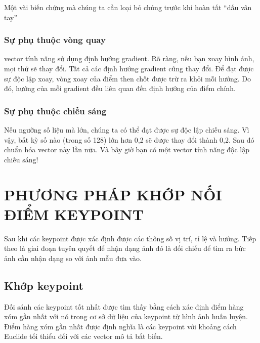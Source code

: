 \documentclass[conference]{IEEEtran}
\begin{document}
Một vài biến chứng mà chúng ta cần loại bỏ chúng trước khi hoàn tất “dấu vân tay”
\subsubsection{Sự phụ thuộc vòng quay}vector tính năng sử dụng định hướng gradient. Rõ ràng, nếu bạn xoay hình ảnh, mọi thứ sẽ thay đổi. Tất cả các định hướng gradient cũng thay đổi. Để đạt được sự độc lập xoay, vòng xoay của điểm then chốt được trừ ra khỏi mỗi hướng. Do đó, hướng của mỗi gradient đều liên quan đến định hướng của điểm chính.
\subsubsection{Sự phụ thuộc chiếu sáng}Nếu ngưỡng số liệu mà lớn, chúng ta có thể đạt được sự độc lập chiếu sáng. Vì vậy, bất kỳ số nào (trong số 128) lớn hơn 0,2 sẽ được thay đổi thành 0,2. Sau đó chuẩn hóa vector này lần nữa. Và bây giờ bạn có một vector tính năng độc lập chiếu sáng!
\medskip
\section{PHƯƠNG PHÁP KHỚP NỐI ĐIỂM KEYPOINT}
\label{Sec:PhuongPhapMatching}
Sau khi các keypoint được xác định được các thông số vị trí, tỉ lệ và hướng. Tiếp theo là giai đoạn tuyên quyết để nhận dạng ảnh đó là đối chiếu để tìm ra bức ảnh cần nhận dạng so với ảnh mẫu đưa vào.
\subsection{Khớp keypoint}
Đối sánh các keypoint tốt nhất được tìm thấy bằng cách xác định điểm hàng xóm gần nhất với nó trong cơ sở dữ liệu của keypoint từ hình ảnh huấn luyện. Điểm hàng xóm gần nhất được định nghĩa là các keypoint với khoảng cách Euclide tối thiểu đối với các vector mô tả bất biến.
\end{document}
